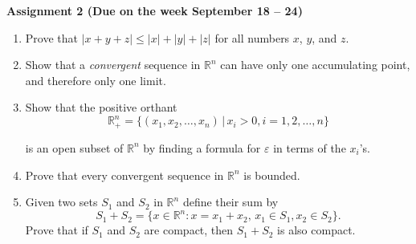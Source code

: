 \documentclass{article}
\begin{document}
\fontsize{14}{21}
\selectfont
\centerline{\textbf{Assignment 2 (Due on the week September 18 -- 24)}}
\fontsize{12}{18}
\selectfont
\begin{enumerate}

\item Prove that $|x+y+z|\leqslant |x|+|y|+|z|$ for all numbers $x$, $y$, and $z$.

\item Show that a \textit{convergent} sequence in $\mathbb{R}^n$ can have only one accumulating point, and therefore only one limit.

\item Show that the positive orthant
$$\mathbb{R}^n_+=\{(x_1, x_2,\dots, x_n)\,|\, x_i>0, i=1,2,\dots, n\}$$

is an open subset of $\mathbb{R}^n$ by finding a formula for $\varepsilon$ in terms of the $x_i$'s.

\item Prove that every convergent sequence in $\mathbb{R}^n$ is bounded.

\item Given two sets $S_1$ and $S_2$ in $\mathbb{R}^n$ define their sum by $$S_1+S_2=\{x\in \mathbb{R}^n\colon x=x_1+x_2,\, x_1\in S_1, x_2\in S_2\}.$$ Prove that if $S_1$ and $S_2$ are compact, then $S_1+S_2$ is also compact.

\end{enumerate}
\end{document}
